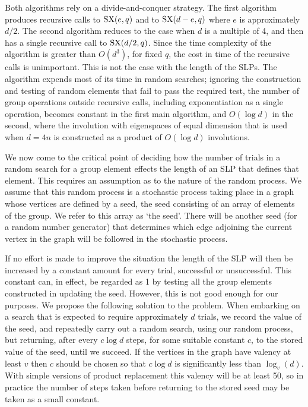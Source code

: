 \documentclass[12pt]{article}
\def\SX{{\rm SX}}
\begin{document}
Both algorithms rely on a divide-and-conquer strategy. The first
algorithm produces recursive calls to $\SX(e,q)$ and to  $\SX(d-e,q)$
where $e$ is approximately $d/2$. The second algorithm reduces to the
case when $d$ is a multiple of 4, and then has a single recursive call
to $\SX(d/2,q)$. Since the time complexity of the algorithm is greater
than $O(d^3)$, for fixed $q$, the cost in time of the recursive calls
is unimportant. This is not the case with the length of the
SLPs. The algorithm expends most of its time in
random searches; ignoring the construction and testing of
random elements that fail to pass the required test,
 the number of group
operations outside  recursive calls, including exponentiation as a
single operation, becomes constant in the first main algorithm, and $O(\log d)$ in
the second, where the involution with eigenspaces of equal dimension 
that is used when $d=4n$ is constructed as a product of $O(\log d)$ involutions.

We now come to the critical point of deciding how the number of trials in a random search for 
a group element effects the length of an SLP that defines that element.  This requires an
assumption as to the nature of the random process.  We assume that this random process
is a stochastic process taking place in a graph whose vertices are defined by a seed, the seed
consisting of an array of elements of the group.  We refer to this array as `the seed'.  There will
be another seed (for a random number generator) that determines which edge adjoining
the current vertex in the graph will be followed in the stochastic process.

If no effort is made to improve the situation the length of the SLP will then be increased by a constant
amount for every trial, successful or unsuccessful. This constant can, in effect, be regarded as 1 by testing all the group elements constructed in updating the seed.  However, this is not good enough for our purposes.  We propose the following solution to the problem.  When embarking on a search that is
expected to require approximately $d$ trials, we record the value of the seed, and repeatedly carry
out a random search, using our random process, but returning, after every $c\log d$ steps, for some suitable constant $c$, to the stored value of the seed, until we succeed.  If the vertices in the graph
have valency at least $v$ then $c$ should be chosen so that  $c\log d$ is significantly less than
$\log_v(d)$.  With simple versions of product replacement this valency will be at least 50, so in practice
the number of steps taken before returning to the stored seed may be taken as a small constant.
\end{document}
